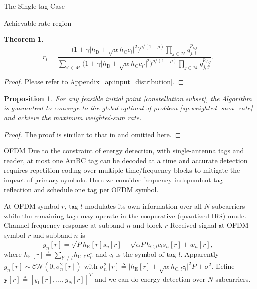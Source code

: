 \documentclass[journal]{IEEEtran}
\newtheorem{proposition}{Proposition}
\newtheorem{theorem}{Theorem}
\begin{document}
\begin{section}{The Single-tag Case}
\begin{subsection}{Achievable rate region}
\begin{theorem}
				\begin{equation}
					r_i = \frac{\bigl( 1 + \gamma \lvert h_{\mathrm{D}} + \sqrt{\alpha} h_{\mathrm{C}} c_i \rvert^2 \bigr)^{\rho / (1 - \rho)} \prod_{j \in \mathcal{M}} q_{j, i}^{p_{i, j}}}{\sum_{i' \in \mathcal{M}} \bigl( 1 + \gamma \lvert h_{\mathrm{D}} + \sqrt{\alpha} h_{\mathrm{C}} c_{i'} \rvert^2 \bigr)^{\rho / (1 - \rho)} \prod_{j \in \mathcal{M}} q_{j, i'}^{p_{i', j}}}.
					\label{eq:input_distribution}
				\end{equation}
				\label{th:input_distribution}
			\end{theorem}
			\begin{proof}
				Please refer to Appendix~\ref{ap:input_distribution}.
			\end{proof}
			\begin{proposition}
				For any feasible initial point [constellation subset], the Algorithm is guaranteed to converge to the global optimal of problem \eqref{op:weighted_sum_rate} and achieve the maximum weighted-sum rate.
			\end{proposition}
			\begin{proof}
				The proof is similar to that in \cite[Chapter~9.3]{Yeung2008} and omitted here.
			\end{proof}
		\end{subsection}
	\end{section}

	\begin{section}{OFDM}
		Due to the constraint of energy detection, with single-antenna tags and reader, at most one AmBC tag can be decoded at a time and accurate detection requires repetition coding over multiple time/frequency blocks to mitigate the impact of primary symbols. Here we consider frequency-independent tag reflection and schedule one tag per OFDM symbol.

		At OFDM symbol $r$, tag $l$ modulates its own information over all $N$ subcarriers while the remaining tags may operate in the cooperative (quantized IRS) mode. Channel frequency response at subband $n$ and block $r$
		Received signal at OFDM symbol $r$ and subband $n$ is
		\begin{equation}
			y_n[r] = \sqrt{P} h_{\mathrm{E}}[r] s_n[r] + \sqrt{\alpha P} h_{\mathrm{C},l} c_l s_n[r] + w_n[r],
		\end{equation}
		where $h_{\mathrm{E}}[r] \triangleq \sum_{l' \ne l} h_{\mathrm{C},l'} c_{l'}^\star$ and $c_l$ is the symbol of tag $l$. Apparently $y_n[r] \sim \mathcal{CN}(0,\sigma_n^2[r])$ with $\sigma_n^2[r] \triangleq \lvert h_{\mathrm{E}}[r] + \sqrt{\alpha} h_{\mathrm{C},l} c_l \rvert^2 P + \sigma^2$. Define $\boldsymbol{y}[r] \triangleq [y_1[r],\ldots,y_N[r]]^T$ and we can do energy detection over $N$ subcarriers.
	\end{section}
\end{document}
